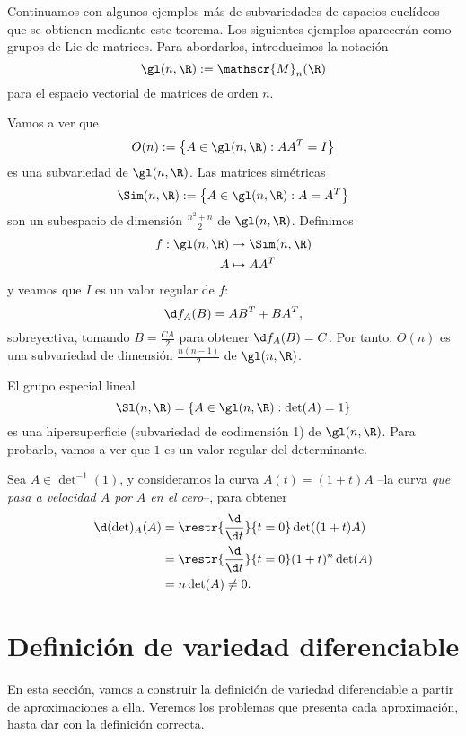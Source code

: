 Continuamos con algunos ejemplos más de subvariedades de espacios euclídeos que
se obtienen mediante este teorema. Los siguientes ejemplos aparecerán como
grupos de Lie de matrices. Para abordarlos, introducimos la notación
  \[
    \gl(n,\R) := \mathscr{M}_{n}(\R)
  \]
  para el espacio vectorial de matrices de orden $n$.
\begin{ejemplo} \label{ejemplo:ortogonal}
  Vamos a ver que
  \[
    O(n) := \left\{ A\in\gl(n,\R) : AA^{T} = I \right\}
  \]
  es una subvariedad de $\gl(n,\R)$. Las matrices simétricas
  \[
    \Sim(n,\R) := \left\{ A\in\gl(n,\R) : A = A^{T} \right\}
  \]
  son un subespacio de dimensión $\frac{n^{2}+n}{2}$ de $\gl(n,\R)$.
  Definimos
\begin{alignat*}{2}
    f: \gl(n,\R) & \to \Sim(n,\R) \\
    A & \mapsto AA^{T}
\end{alignat*}
y veamos que $I$ es un valor regular de $f$:
\[
  \d f_{A}(B) = AB^{T} + BA^{T}
,\]
sobreyectiva, tomando $B = \frac{CA}{2}$ para obtener $\d f_{A}(B) = C$. Por
tanto, $O(n)$ es una subvariedad de dimensión $\frac{n(n-1)}{2}$ de $\gl(n,\R)$.
\end{ejemplo}

\begin{ejemplo}
  El grupo especial lineal
  \[
    \Sl(n,\R) = \left\{ A\in \gl(n,\R) : \det(A) = 1 \right\}
  \]
  es una hipersuperficie (subvariedad de codimensión 1) de $\gl(n,\R)$. Para
  probarlo, vamos a ver que $1$ es un valor regular del determinante.

  Sea $A\in\det^{-1}(1)$, y consideramos la curva $A(t) = (1+t)A$ --la curva
  \emph{que pasa a velocidad $A$ por $A$ en el cero}--, para obtener
  \begin{align*}
    \d (\det)_{A}(A) &= \restr{\frac{\d}{\d t}}{t = 0} \det((1+t)A)\\
                   &= \restr{\frac{\d}{\d t}}{t = 0}(1+t)^{n}\det(A)\\
    &= n\det(A) \ne 0.
  \end{align*}
\end{ejemplo}

\section{Definición de variedad diferenciable}

En esta sección, vamos a construir la definición de variedad diferenciable a
partir de aproximaciones a ella. Veremos los problemas que presenta cada
aproximación, hasta dar con la definición correcta.


